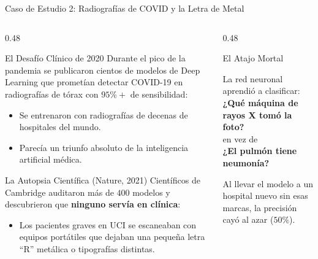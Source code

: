 \documentclass[10pt,aspectratio=169]{beamer}
\begin{document}
\begin{frame}{Caso de Estudio 2: Radiografías de COVID y la Letra de Metal}
  \begin{columns}[T]
    \begin{column}{0.48\textwidth}
      \begin{block}{El Desafío Clínico de 2020}
        \scriptsize
        Durante el pico de la pandemia se publicaron cientos de modelos de Deep Learning que prometían detectar COVID-19 en radiografías de tórax con $95\%+$ de sensibilidad:
        \begin{itemize}
          \item Se entrenaron con radiografías de decenas de hospitales del mundo.
          \item Parecía un triunfo absoluto de la inteligencia artificial médica.
        \end{itemize}
      \end{block}

      \vspace{-0.15cm}
      \begin{block}{La Autopsia Científica (Nature, 2021)}
        \scriptsize
        Científicos de Cambridge auditaron más de $400$ modelos y descubrieron que \textbf{ninguno servía en clínica}:
        \begin{itemize}
          \item Los pacientes graves en UCI se escaneaban con equipos portátiles que dejaban una pequeña letra ``R'' metálica o tipografías distintas.
        \end{itemize}
      \end{block}
    \end{column}

    \begin{column}{0.48\textwidth}
      \begin{alertblock}{El Atajo Mortal}
        \scriptsize
        \begin{center}
          La red neuronal aprendió a clasificar: \\
          \vspace{0.15cm}
          \textbf{¿Qué máquina de rayos X tomó la foto?} \\
          en vez de \\
          \textbf{¿El pulmón tiene neumonía?}
        \end{center}
        \vspace{0.1cm}
        Al llevar el modelo a un hospital nuevo sin esas marcas, la precisión cayó al azar ($50\%$).
      \end{alertblock}
    \end{column}
  \end{columns}
\end{frame}
\end{document}
